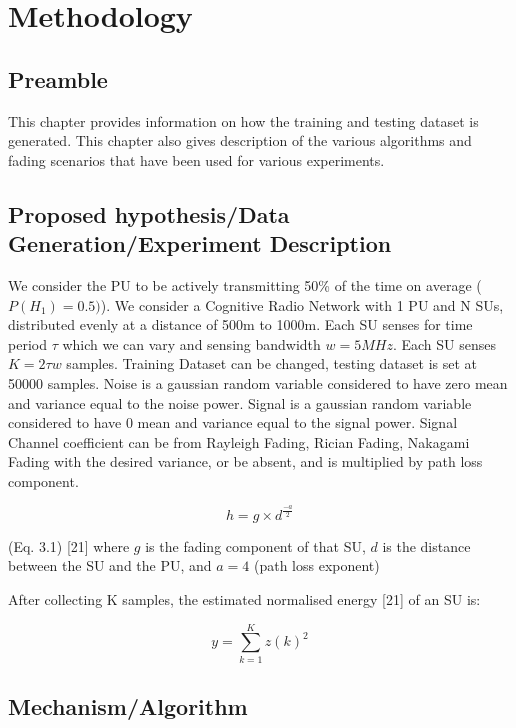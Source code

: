 
\chapter{Methodology}


\section{Preamble}
This chapter provides information on how the training and testing dataset is generated. This chapter also gives description of the various algorithms and fading scenarios that have been used for various experiments. 

\section{Proposed hypothesis/Data Generation/Experiment Description}

We consider the PU to be actively transmitting 50\% of the time on average ($P(H_1)=0.5)$). We consider a Cognitive Radio Network with 1 PU and N SUs, distributed evenly at a distance of 500m to 1000m. Each SU senses for time period $\tau$ which we can vary and sensing bandwidth $w=5MHz$. Each SU senses $K=2\tau w$ samples. Training Dataset can be changed, testing dataset is set at 50000 samples. Noise is a gaussian random variable considered to have zero mean and variance equal to the noise power. Signal is a gaussian random variable considered to have 0 mean and variance equal to the signal power. Signal Channel coefficient can be from Rayleigh Fading, Rician Fading, Nakagami Fading with the desired variance, or be absent, and is multiplied by path loss component.

\begin{equation}
h= g \times d^{\frac {-a}{2}}
\end{equation}

(Eq. 3.1) [21] where $g$ is the fading component of that SU, $d$ is the distance between the SU and the PU, and $a=4$ (path loss exponent)

After collecting K samples, the estimated normalised energy [21] of an SU is:


\begin{equation}
  y = \sum_{k=1}^{K} z(k)^2
  \end{equation}





\section{Mechanism/Algorithm}

